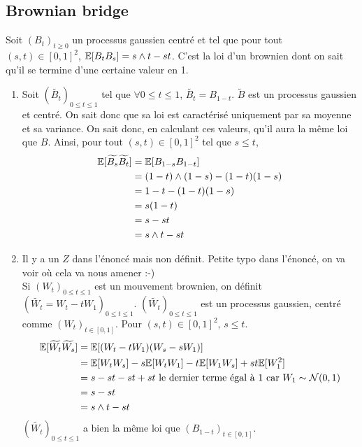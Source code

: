 \subsection{Brownian bridge}
\newcommand{\bt}{B_t}
\newcommand{\bs}{B_s}

Soit $(\bt)_{t \geq 0}$ un processus gaussien centré et tel que pour tout $(s,t) \in [0,1]^2$, $\E[\bt\bs] = s \wedge t - st$. C'est la loi d'un brownien dont on sait qu'il se termine d'une certaine valeur en 1.
\begin{enumerate}
  \item Soit $(\widetilde{B_t})_{0 \leq t \leq 1}$ tel que $\forall 0 \leq t \leq 1$, $\widetilde{B_t} = B_{1-t}$.
    \newcommand{\tilbt}{\widetilde{B_t}}
    \newcommand{\tilbs}{\widetilde{B_s}}
    $\widetilde{B}$ est un processus gaussien et centré. On sait donc que sa loi est caractérisé uniquement par sa moyenne et sa variance. On sait donc, en calculant ces valeurs, qu'il aura la même loi que $B$. Ainsi, pour tout $(s,t) \in [0,1]^2$ tel que $s \leq t$, 
    \renewcommand{\bt}{B_{1-t}}
    \renewcommand{\bs}{B_{1-s}}
    \begin{equation*}
    \begin{split}
      \E[\tilbs \tilbt] &= \E[\bs\bt] \\
      &= (1-t) \wedge (1-s) - (1-t)(1-s) \\
      &= 1-t - (1-t)(1-s) \\
      &= s(1-t) \\
      &= s - st \\
      &= s \wedge t -st
    \end{split}
    \end{equation*}
  \item \Rq Il y a un $Z$ dans l'énoncé mais non définit. Petite typo dans l'énoncé, on va voir où cela va nous amener :-) \\

    \newcommand{\tilwt}{\widetilde{W_t}}
    \newcommand{\tilws}{\widetilde{W_s}}
      \renewcommand{\wt}{W_t}
      \renewcommand{\ws}{W_s}
    Si $(W_t)_{0 \leq t \leq 1}$ est un mouvement brownien, on définit $(\tilwt = W_t - tW_1)_{0 \leq t \leq 1}$. $(\tilwt)_{0 \leq t \leq 1}$ est un processus gaussien, centré comme $(\wt)_{t \in [0,1]}$. Pour $(s,t) \in [0,1]^2$, $s \leq t$.
    \begin{equation*}
    \begin{split}
      \E[\tilwt\tilws] &= \E[(\wt - tW_1)(\ws - sW_1)] \\
      &= \E[\wt\ws] - s\E[\wt W_1] - t\E[W_1 \ws] + st\E[W_1^2] \\
      &= s - st -st +st \text{ le dernier terme égal à 1 car } W_1 \sim \Normale(0,1) \\
      &= s - st \\
      &= s \wedge t - st
    \end{split}
    \end{equation*}
    $(\tilwt)_{0 \leq t \leq 1}$ a bien la même loi que $(\bt)_{t \in [0,1]}$.
\end{enumerate}

